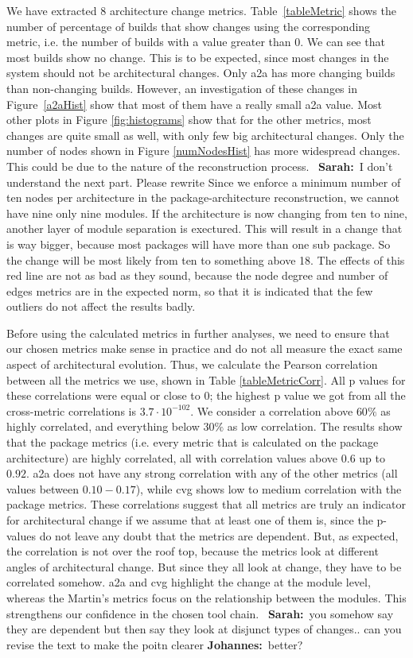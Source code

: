 \documentclass[sigplan, anonymous, review]{acmart}
\newcommand{\sn}[1]{{\color{blue}\textbf{Sarah:}~#1}}
\newcommand{\jk}[1]{{\color{violet}\textbf{Johannes:}~#1}}
\begin{document}
We have extracted 8 architecture change metrics. 
Table~\ref{tableMetric} shows the number of percentage of builds that show changes using the corresponding metric, i.e. the number of builds with a value greater than 0.
We can see that most builds show no change.
This is to be expected, since most changes in the system should not be architectural changes. 
Only a2a has more changing builds than non-changing builds. 
However, an investigation of these changes in Figure~\ref{a2aHist} show that most of them have a really small a2a value. 
Most other plots in Figure \ref{fig:histograms} show that for the other metrics, most changes are quite small as well, with only few big architectural changes. 
Only the number of nodes shown in Figure \ref{numNodesHist} has more widespread changes.
This could be due to the nature of the reconstruction process. ~\sn{I don't understand the next part. Please rewrite} Since we enforce a minimum number of ten nodes per architecture in the package-architecture reconstruction, we cannot have nine only nine modules. If the architecture is now changing from ten to nine, another layer of module separation is exectured. This will result in a change that is way bigger, because most packages will have more than one sub package. So the change will be most likely from ten to something above 18. The effects of this red line are not as bad as they sound, because the node degree and number of edges metrics are in the expected norm, so that it is indicated that the few outliers do not affect the results badly.

Before using the calculated metrics in further analyses, we need to ensure that our chosen metrics make sense in practice and do not all measure the exact same aspect of architectural evolution. Thus, we calculate the Pearson correlation between all the metrics we use, shown in Table \ref{tableMetricCorr}. All p values for these correlations were equal or close to 0; the highest p value we got from all the cross-metric correlations is $3.7 \cdot 10^{-102}$. 
We consider a correlation above $60\%$ as highly correlated, and everything below $30\%$ as low correlation.
The results show that the package metrics (i.e. every metric that is calculated on the package architecture) are highly correlated, all with correlation values above $0.6$ up to $0.92$. a2a does not have any strong correlation with any of the other metrics (all values between $0.10-0.17$), while cvg shows low to medium correlation with the package metrics. 
These correlations suggest that all metrics are truly an indicator for architectural change if we assume that at least one of them is, since the p-values do not leave any doubt that the metrics are dependent.
But, as expected, the correlation is not over the roof top, because the metrics look at different angles of architectural change. But since they all look at change, they have to be correlated somehow. 
a2a and cvg highlight the change at the module level, whereas the Martin's metrics focus on the relationship between the modules. This strengthens our confidence in the chosen tool chain. ~\sn{you somehow say they are dependent but then say they look at disjunct types of changes.. can you revise the text to make the poitn clearer} \jk{better?}
\end{document}
